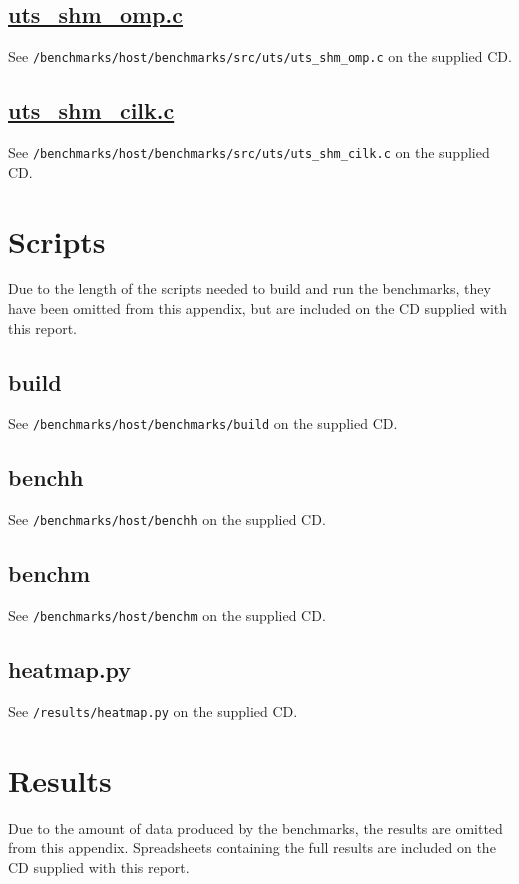 \documentclass{report}
\newcommand\purl[1]{\protect\url{#1}} %
\begin{document}
\subsection{\purl{uts_shm_omp.c}} \label{App:utsshmompc}
See \verb!/benchmarks/host/benchmarks/src/uts/uts_shm_omp.c! on the supplied CD.

\subsection{\purl{uts_shm_cilk.c}} \label{App:utsshmcilkc}
See \verb!/benchmarks/host/benchmarks/src/uts/uts_shm_cilk.c! on the supplied CD.

\section{Scripts} \label{App:scripts}
Due to the length of the scripts needed to build and run the benchmarks, they have been omitted from this appendix, but are included on the CD supplied with this report.

\subsection{build} \label{App:build}
See \verb!/benchmarks/host/benchmarks/build! on the supplied CD.

\subsection{benchh} \label{App:benchh}
See \verb!/benchmarks/host/benchh! on the supplied CD.

\subsection{benchm} \label{App:benchm}
See \verb!/benchmarks/host/benchm! on the supplied CD.

\subsection{heatmap.py} \label{App:heatmappy}
See \verb!/results/heatmap.py! on the supplied CD.

\section{Results}
Due to the amount of data produced by the benchmarks, the results are omitted from this appendix. Spreadsheets containing the full results are included on the CD supplied with this report.
\end{document}
